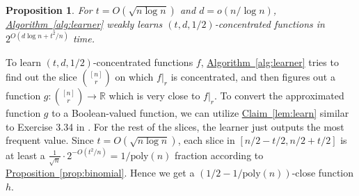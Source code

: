 \documentclass[11pt]{article}
\numberwithin{equation}{section}
\newtheorem{proposition}[theorem]{Proposition}
\theoremstyle{definition}
\theoremstyle{plain}
\newcommand{\expref}[2]{\hyperref[#2]{#1~\ref{#2}}}
\newcommand{\poly}{\text{poly}}
\newcommand{\warn}[1]{#1}
\begin{document}
\begin{proposition}\label{prop:learner}
    For $t=O(\sqrt{n\log n})$ and $d=o(n/\log n)$, \expref{Algorithm}{alg:learner} weakly learns $(t,d,1/2)$-concentrated functions in $2^{O(d\log n + t^2/n)}$ time.
\end{proposition}

To learn $(t,d,1/2)$-concentrated functions $f$, \expref{Algorithm}{alg:learner} tries to find out the slice %
$\binom{[n]}{r}$ %
on which $f|_r$ is concentrated, and then figures out a function $g:
%
\binom{[n]}{r} %
\rightarrow \mathbb{R}$ which is very close to $f|_r$. To convert the approximated function $g$ to a Boolean-valued function, we can utilize \expref{Claim}{lem:learn} similar to Exercise 3.34 in \cite{book}.
For the rest of the slices, the learner just outputs the most frequent value. \warn{Since $t=O(\sqrt{n\log n})$, each slice in $[n/2-t/2, n/2+t/2]$ is at least a $\frac{1}{\sqrt{n}}\cdot 2^{-O(t^2/n)}=1/\poly(n)$ fraction according to \expref{Proposition}{prop:binomial}. Hence we get a $(1/2-1/\poly(n))$-close function $h$.}
\end{document}
